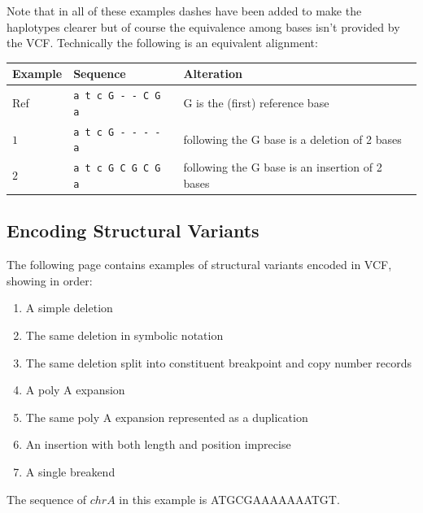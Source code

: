 \documentclass[8pt]{article}
\begin{document}
Note that in all of these examples dashes have been added to make the haplotypes clearer but of course the equivalence among bases isn't provided by the VCF.
Technically the following is an equivalent alignment:

\vspace{0.3cm}
\begin{tabular}{ | l | l | l | }
\hline
Example & Sequence & Alteration \\ \hline
Ref & \verb|a t c G - - C G a| & G is the (first) reference base \\ \hline
$1$ & \verb|a t c G - - - - a| & following the G base is a deletion of 2 bases \\ \hline
$2$ & \verb|a t c G C G C G a| & following the G base is an insertion of 2 bases \\ \hline
\end{tabular}

\subsection{Encoding Structural Variants}
The following page contains examples of structural variants encoded in VCF, showing in order:
\begin{enumerate}
  \item A simple deletion
  \item The same deletion in symbolic notation
  \item The same deletion split into constituent breakpoint and copy number records
  \item A poly A expansion
  \item The same poly A expansion represented as a duplication
  \item An insertion with both length and position imprecise
  \item A single breakend
\end{enumerate}
The sequence of $chrA$ in this example is ATGCGAAAAAAATGT.
\end{document}
